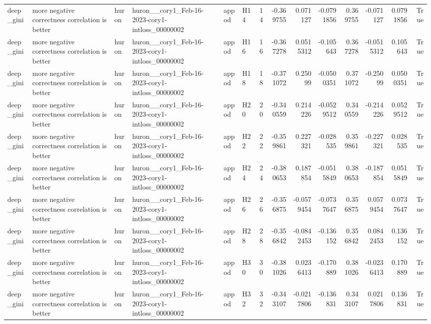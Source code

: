 \begin{longtable}{llllllrrrrrrrr}
deep\_gini & more negative correctness correlation is better & huron & huron\_\_cory1\_Feb-16-2023-cory1-intloss\_00000002 & appod & H14 & 14 & -0.369755 & 0.071127 & -0.0791856 & 0.369755 & -0.071127 & 0.0791856 & True \\
deep\_gini & more negative correctness correlation is better & huron & huron\_\_cory1\_Feb-16-2023-cory1-intloss\_00000002 & appod & H16 & 16 & -0.367278 & 0.0515312 & -0.105643 & 0.367278 & -0.0515312 & 0.105643 & True \\
deep\_gini & more negative correctness correlation is better & huron & huron\_\_cory1\_Feb-16-2023-cory1-intloss\_00000002 & appod & H18 & 18 & -0.371072 & 0.25099 & -0.0500351 & 0.371072 & -0.25099 & 0.0500351 & True \\
deep\_gini & more negative correctness correlation is better & huron & huron\_\_cory1\_Feb-16-2023-cory1-intloss\_00000002 & appod & H20 & 20 & -0.340559 & 0.214226 & -0.0529512 & 0.340559 & -0.214226 & 0.0529512 & True \\
deep\_gini & more negative correctness correlation is better & huron & huron\_\_cory1\_Feb-16-2023-cory1-intloss\_00000002 & appod & H22 & 22 & -0.359861 & 0.227321 & -0.028535 & 0.359861 & -0.227321 & 0.028535 & True \\
deep\_gini & more negative correctness correlation is better & huron & huron\_\_cory1\_Feb-16-2023-cory1-intloss\_00000002 & appod & H24 & 24 & -0.380653 & 0.187854 & -0.0515849 & 0.380653 & -0.187854 & 0.0515849 & True \\
deep\_gini & more negative correctness correlation is better & huron & huron\_\_cory1\_Feb-16-2023-cory1-intloss\_00000002 & appod & H26 & 26 & -0.356875 & -0.0579454 & -0.0737647 & 0.356875 & 0.0579454 & 0.0737647 & True \\
deep\_gini & more negative correctness correlation is better & huron & huron\_\_cory1\_Feb-16-2023-cory1-intloss\_00000002 & appod & H28 & 28 & -0.356842 & -0.0842453 & -0.136152 & 0.356842 & 0.0842453 & 0.136152 & True \\
deep\_gini & more negative correctness correlation is better & huron & huron\_\_cory1\_Feb-16-2023-cory1-intloss\_00000002 & appod & H30 & 30 & -0.381026 & 0.0236413 & -0.170889 & 0.381026 & -0.0236413 & 0.170889 & True \\
deep\_gini & more negative correctness correlation is better & huron & huron\_\_cory1\_Feb-16-2023-cory1-intloss\_00000002 & appod & H32 & 32 & -0.343107 & -0.0217806 & -0.136831 & 0.343107 & 0.0217806 & 0.136831 & True \\

\end{longtable}
